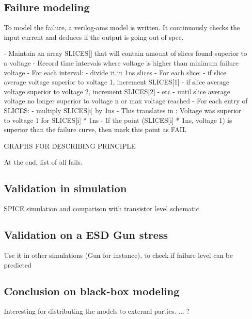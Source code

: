 %

\subsection{Failure modeling}


%
To model the failure, a verilog-ams model is written.
It continuously checks the input current and deduces if the output is going out of spec.

\begin{algorithmic}
- Maintain an array SLICES[] that will contain amount of slices found superior to a voltage
- Record time intervals where voltage is higher than minimum failure voltage
- For each interval:
  - divide it in 1ns slices
  - For each slice:
      - if slice average voltage superior to voltage 1, increment SLICES[1]
      - if slice average voltage superior to voltage 2, increment SLICES[2]
      - etc
      - until slice average voltage no longer superior to voltage n or max voltage reached
- For each entry of SLICES:
  - multiply SLICES[i] by 1ns
  - This translates in : Voltage was superior to voltage 1 for SLICES[i] * 1ns
  - If the point (SLICES[i] * 1ns, voltage 1) is superior than the failure curve, then mark this point as FAIL
\end{algorithmic}

GRAPHS FOR DESCRIBING PRINCIPLE

At the end, list of all fails.

\subsection{Validation in simulation}

SPICE simulation and comparison with transistor level schematic

\subsection{Validation on a ESD Gun stress}
Use it in other simulations (Gun for instance), to check if failure level can be predicted

\subsection{Conclusion on black-box modeling}

Interesting for distributing the models to external parties.
... ?
